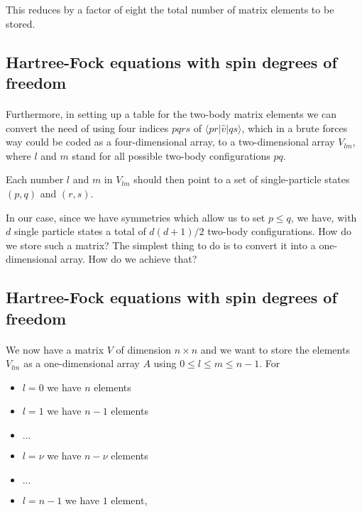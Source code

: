\documentclass[%
twoside,                 %
final,                   %
10pt]{article}
\begin{document}
\noindent
This reduces by a factor of eight the total number of matrix elements to be stored.



\subsection*{Hartree-Fock equations with spin degrees of freedom}

\paragraph{}

Furthermore, in setting up a table for the two-body matrix elements we can convert the need of using four indices $pqrs$ of 
$\langle pr | \hat{v}|qs\rangle$, which in a brute forces way could be coded as a four-dimensional array, to 
a two-dimensional array $V_{lm}$, where $l$ and $m$ stand for all possible two-body configurations $pq$.

Each number $l$ and $m$ in $V_{lm}$  should then point to a set of single-particle  states $(p,q)$ and $(r,s)$.  

In our case, since we have 
symmetries which allow us to set $p\le q$, we have, with $d$ single particle states a total of $d(d+1)/2$ two-body configurations.
How do we store such a matrix? The simplest thing to do is to convert it into a one-dimensional array. How do we achieve that?



\subsection*{Hartree-Fock equations with spin degrees of freedom}

\paragraph{}

We now have a matrix $V$ of dimension $n\times n$ and we want to store the elements $V_{lm}$ as a one-dimensional array $A$ using
$0 \le l \le m \le n-1$. For

\begin{itemize}
  \item $l=0$ we have $n$ elements

  \item $l=1$ we have $n-1$ elements

  \item $\dots$

  \item $l=\nu$ we have $n-\nu$ elements

  \item $\dots$

  \item $l=n-1$ we have $1$ element,
\end{itemize}
\end{document}
